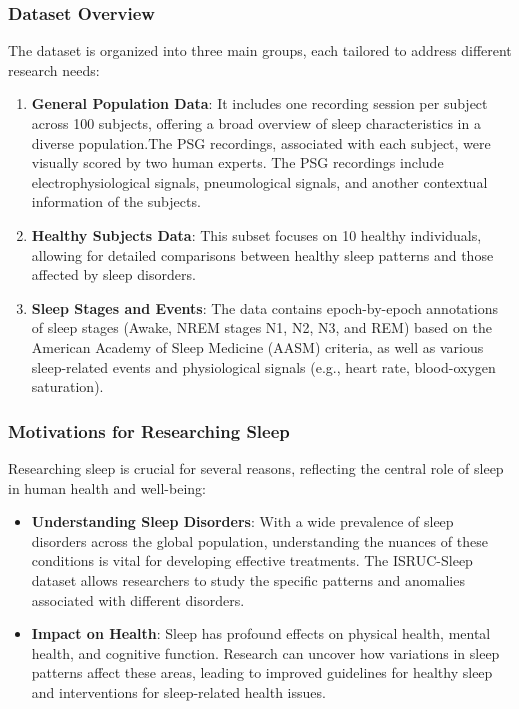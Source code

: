 \documentclass[
]{article}
\begin{document}
\subsubsection{Dataset Overview}\label{dataset-overview}

The dataset is organized into three main groups, each tailored to
address different research needs:

\begin{enumerate}
\def\labelenumi{\arabic{enumi}.}
\item
  \textbf{General Population Data}: It includes one recording session
  per subject across 100 subjects, offering a broad overview of sleep
  characteristics in a diverse population.The PSG recordings, associated
  with each subject, were visually scored by two human experts. The PSG
  recordings include electrophysiological signals, pneumological
  signals, and another contextual information of the subjects.
\item
  \textbf{Healthy Subjects Data}: This subset focuses on 10 healthy
  individuals, allowing for detailed comparisons between healthy sleep
  patterns and those affected by sleep disorders.
\item
  \textbf{Sleep Stages and Events}: The data contains epoch-by-epoch
  annotations of sleep stages (Awake, NREM stages N1, N2, N3, and REM)
  based on the American Academy of Sleep Medicine (AASM) criteria, as
  well as various sleep-related events and physiological signals (e.g.,
  heart rate, blood-oxygen saturation).
\end{enumerate}

\subsubsection{Motivations for Researching
Sleep}\label{motivations-for-researching-sleep}

Researching sleep is crucial for several reasons, reflecting the central
role of sleep in human health and well-being:

\begin{itemize}
\item
  \textbf{Understanding Sleep Disorders}: With a wide prevalence of
  sleep disorders across the global population, understanding the
  nuances of these conditions is vital for developing effective
  treatments. The ISRUC-Sleep dataset allows researchers to study the
  specific patterns and anomalies associated with different disorders.
\item
  \textbf{Impact on Health}: Sleep has profound effects on physical
  health, mental health, and cognitive function. Research can uncover
  how variations in sleep patterns affect these areas, leading to
  improved guidelines for healthy sleep and interventions for
  sleep-related health issues.
\end{itemize}
\end{document}
